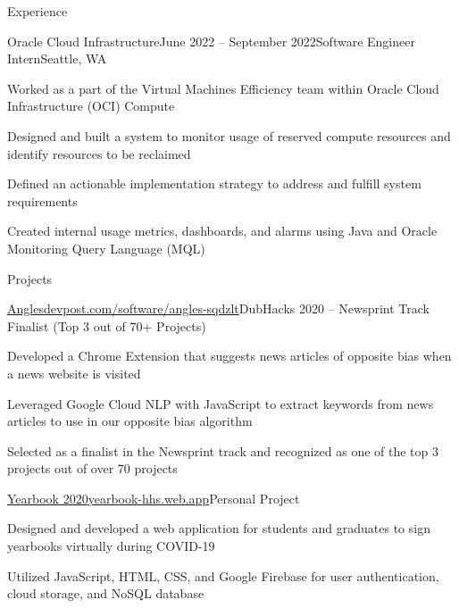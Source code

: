 \documentclass{resume} %
\begin{document}
\begin{rSection}{Experience}
\begin{rSubsection}{Oracle Cloud Infrastructure}{June 2022 – September 2022}{Software Engineer Intern}{Seattle, WA}
\item Worked as a part of the Virtual Machines Efficiency team within Oracle Cloud Infrastructure (OCI) Compute
\item Designed and built a system to monitor usage of reserved compute resources and identify resources to be reclaimed
\item Defined an actionable implementation strategy to address and fulfill system requirements
\item Created internal usage metrics, dashboards, and alarms using Java and Oracle Monitoring Query Language (MQL)
\end{rSubsection}

\end{rSection}


\begin{rSection}{Projects}

\begin{project}{\href{https://devpost.com/software/angles-sqdzlt}{Angles}}{\href{https://devpost.com/software/angles-sqdzlt}{devpost.com/software/angles-sqdzlt}}{DubHacks 2020 – Newsprint Track Finalist (Top 3 out of 70+ Projects)}
\item Developed a Chrome Extension that suggests news articles of opposite bias when a news website is visited
\item Leveraged Google Cloud NLP with JavaScript to extract keywords from news articles to use in our opposite bias algorithm
\item Selected as a finalist in the Newsprint track and recognized as one of the top 3 projects out of over 70 projects
\end{project}

\begin{project}{\href{https://yearbook-hhs.web.app/}{Yearbook 2020}}{\href{https://yearbook-hhs.web.app/}{yearbook-hhs.web.app}}{Personal Project}
\item Designed and developed a web application for students and graduates to sign yearbooks virtually during COVID-19
\item Utilized JavaScript, HTML, CSS, and Google Firebase for user authentication, cloud storage, and NoSQL database
\end{project}

\end{rSection}
\end{document}
